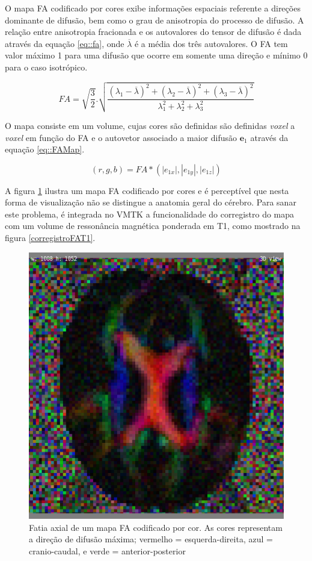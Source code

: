 \documentclass[
    12pt,                %
    oneside,            %
    a4paper,            %
    english,            %
    french,                %
    spanish,            %
    brazil                %
    ]{abntex2}
\begin{document}
O mapa FA codificado por cores exibe informações espaciais referente a direções dominante de difusão, bem como o grau de anisotropia do processo de difusão.
A relação entre anisotropia fracionada e os autovalores do tensor de difusão é dada através da equação \ref{eq::fa}, onde $\overline{\lambda}$ é a média dos três autovalores. O FA tem valor máximo 1 para uma difusão que ocorre em somente uma direção e mínimo 0 para o caso isotrópico.

\begin{equation}
\label{eq::fa}
    FA = \sqrt{\frac{3}{2}}.\sqrt{\frac{(\lambda_1 - \overline{\lambda})^2 + (\lambda_2 - \overline{\lambda})^2 + (\lambda_3 - \overline{\lambda})^2}{\lambda_1^2 + \lambda_2^2 + \lambda_3^2}}
\end{equation}


O mapa consiste em um volume, cujas cores são definidas são definidas \textit{voxel} a \textit{voxel} em função do FA e o autovetor associado a maior difusão $\mathbf{e}_1$ através da equação \ref{eq::FAMap}.

\begin{equation}
\label{eq::FAMap}
    (r,g,b) = FA*(|e_{1x}|,|e_{1y}|,|e_{1z}|)
\end{equation}

A figura \ref{fig::MapaFA} ilustra um mapa FA codificado por cores e é perceptível que nesta forma de visualização não se distingue a anatomia geral do cérebro. Para sanar este problema, é integrada no VMTK a funcionalidade do corregistro do mapa com um volume de ressonância magnética ponderada em T1, como mostrado na figura \ref{corregistroFAT1}.

\begin{figure}[H]

    \centering

    \includegraphics[width=0.45\linewidth, angle=0]{figs/Exemplo_Trabalhos_Relacionados/MapaFA.png}
    \caption{Fatia axial de um mapa FA codificado por cor. As cores representam a direção de difusão máxima; vermelho = esquerda-direita, azul = cranio-caudal, e verde = anterior-posterior}
    \label{fig::MapaFA}
\end{figure}
\end{document}

